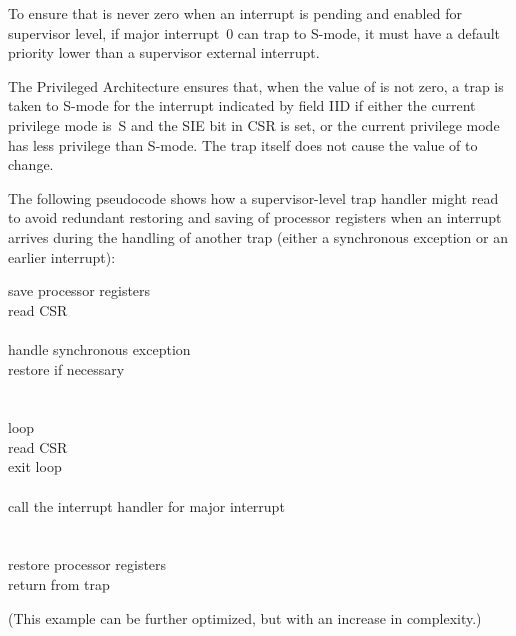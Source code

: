 \begin{commentary}
To ensure that  is never zero when an interrupt is pending
and enabled for supervisor level, if major interrupt~0 can trap to
\hbox{S-mode}, it must have a default priority lower than a supervisor
external interrupt.
\end{commentary}

The {\RISCV} Privileged Architecture ensures that, when the value
of  is not zero, a trap is taken to \mbox{S-mode} for the
interrupt indicated by field IID if either the current privilege
mode is~S and the SIE bit in CSR  is set, or the current
privilege mode has less privilege than \mbox{S-mode}.
The trap itself does not cause the value of  to change.

The following pseudocode shows how a supervisor-level trap handler
might read  to avoid redundant restoring and saving of
processor registers when an interrupt arrives during the handling of
another trap (either a synchronous exception or an earlier interrupt):
\begin{displayLinesTable}
save processor registers \\
read CSR  \\
 \\
\qquad handle synchronous exception  \\
\qquad restore  if necessary \\
\z{\RB}\\
 \\
\qquad loop \z{\LB} \\
\qquad\qquad {}read CSR  \\
\qquad\qquad {} exit loop \\
\qquad\qquad {} \\
\qquad\qquad call the interrupt handler for major interrupt  \\
\qquad \z{\RB} \\
\z{\RB} \\
restore processor registers \\
return from trap \\
\end{displayLinesTable}
(This example can be further optimized, but with an increase in
complexity.)

